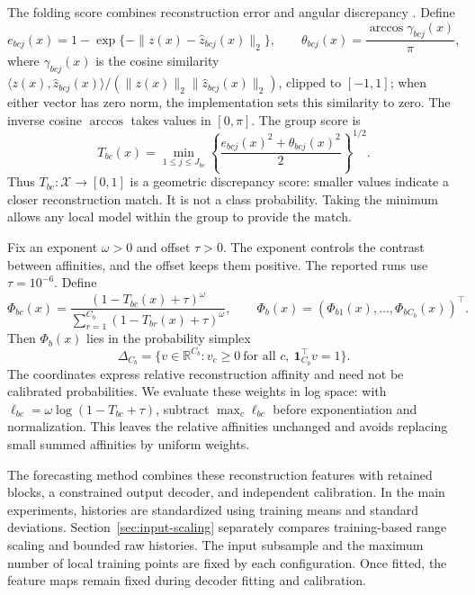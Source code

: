 The folding score combines reconstruction error and angular discrepancy
\citep[Section~3.3]{kumar2026limits}. Define
\[
 e_{bcj}(x)=1-\exp\{-\|z(x)-\widehat z_{bcj}(x)\|_2\},
 \qquad
 \theta_{bcj}(x)=\frac{\arccos\gamma_{bcj}(x)}{\pi},
\]
where $\gamma_{bcj}(x)$ is the cosine similarity
$\langle z(x),\widehat z_{bcj}(x)\rangle/
 (\|z(x)\|_2\|\widehat z_{bcj}(x)\|_2)$, clipped to $[-1,1]$;
when either vector has zero norm, the implementation sets this similarity
to zero. The inverse cosine $\arccos$ takes values in $[0,\pi]$. The group
score is
\[
 T_{bc}(x)=\min_{1\leq j\leq J_{bc}}
            \left\{\frac{e_{bcj}(x)^2+\theta_{bcj}(x)^2}{2}\right\}^{1/2}.
\]
Thus $T_{bc}:\mathcal X\to[0,1]$ is a geometric discrepancy score: smaller
values indicate a closer reconstruction match. It is not a class probability.
Taking the minimum allows any local model within the group to provide the
match.

Fix an exponent $\omega>0$ and offset $\tau>0$. The exponent controls the
contrast between affinities, and the offset keeps them positive. The reported
runs use $\tau=10^{-6}$. Define
\begin{equation}
 \Phi_{bc}(x)=
 \frac{(1-T_{bc}(x)+\tau)^\omega}
 {\sum_{r=1}^{C_b}(1-T_{br}(x)+\tau)^\omega},
 \qquad
 \Phi_b(x)=(\Phi_{b1}(x),\ldots,\Phi_{bC_b}(x))^\top.
 \label{eq:soft-features}
\end{equation}
Then $\Phi_b(x)$ lies in the probability simplex
\[
 \Delta_{C_b}=\{v\in\mathbb R^{C_b}:v_c\geq0\ \text{for all }c,
                                    \ \mathbf1_{C_b}^\top v=1\}.
\]
The coordinates express relative reconstruction affinity and need not be
calibrated probabilities. We evaluate these weights in log space: with
$\ell_{bc}=\omega\log(1-T_{bc}+\tau)$, subtract
$\max_c\ell_{bc}$ before exponentiation and normalization. This leaves the
relative affinities unchanged and avoids replacing small summed affinities
by uniform weights.

The forecasting method combines these reconstruction features with retained
blocks, a constrained output decoder, and independent calibration. In the
main experiments, histories are standardized using training means and
standard deviations.
Section~\ref{sec:input-scaling} separately compares training-based range
scaling and bounded raw histories. The input subsample and the maximum number
of local training points are fixed by each configuration. Once fitted, the
feature maps remain fixed during decoder fitting and calibration.


